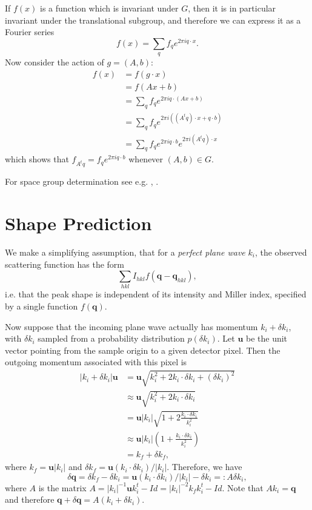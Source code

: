 \documentclass{report}
\newcommand{\bq}{\mathbf{q}}
\newcommand{\bu}{\mathbf{u}}
\begin{document}
If $f(x)$ is a function which is invariant under $G$, then it
is in particular invariant under the translational subgroup, and therefore we can express it as a Fourier series
\[ f(x) = \sum_q f_q e^{2\pi i q \cdot x}. \]
Now consider the action of $g = (A,b)$:
\begin{align*}
  f(x)
  &= f(g\cdot x) \\
  &= f(Ax + b) \\
  &= \sum_q f_q e^{2\pi i q \cdot (Ax + b)} \\
  &= \sum_q f_q e^{2\pi i ((A^t q) \cdot x + q \cdot b)} \\
  &= \sum_q f_q e^{2 \pi i q \cdot b} e^{2\pi i (A^t q) \cdot x}
\end{align*}
which shows that $f_{A^t q} = f_{q} e^{2 \pi i q \cdot b}$ whenever $(A,b) \in G$.


For space group determination see e.g. \cite{evans-2011}, \cite{kabsch-2010}.


\chapter{Shape Prediction}

We make a simplifying assumption, that for a \emph{perfect plane wave} $k_i$, the observed scattering function has the form
\[ \sum_{hkl} I_{hkl} f(\bq - \bq_{hkl}), \]
i.e. that the peak shape is independent of its intensity and Miller index, specified by a single function $f(\bq)$.

Now suppose that the incoming plane wave actually has momentum $k_i + \delta k_i$, with $\delta k_i$ sampled from a probability distribution $p(\delta k_i)$. Let $\bu$ be the unit vector pointing from the sample origin to a given detector pixel. Then the outgoing momentum associated with this pixel is
\begin{align*}
  |k_i + \delta k_i| \bu &= \bu \sqrt{k_i^2  + 2 k_i \cdot \delta k_i + (\delta k_i)^2 } \\
  &\approx \bu\sqrt{k_i^2  + 2 k_i \cdot \delta k_i} \\
  &= \bu|k_i|\sqrt{1+ 2\frac{k_i \cdot \delta k_i}{k_i^2}} \\
  &\approx \bu|k_i| \left(1 +  \frac{k_i \cdot \delta k_i}{k_i^2}\right) \\
  &= k_f + \delta k_f,
\end{align*}
where $k_f = \bu|k_i|$ and $\delta k_f = \bu(k_i \cdot \delta k_i) / |k_i|$. Therefore, we have
\[ \delta\bq = \delta k_f - \delta k_i = \bu(k_i \cdot \delta k_i) / |k_i| - \delta k_i =: A \delta k_i, \]
where $A$ is the matrix $A = |k_i|^{-1} \bu k_i^t - Id = |k_i|^{-2} k_f k_i^t - Id$. Note that $A k_i = \bq$ and therefore
$\bq + \delta \bq = A(k_i + \delta k_i)$.
\end{document}
